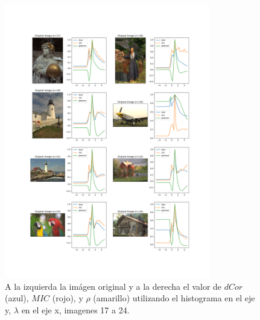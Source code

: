 \begin{figure}
    \centering
    \includegraphics[width=0.8\textwidth]{figuras/hist_comp_3.png}
    \caption{A la izquierda la im\'agen original y a la derecha el valor de $dCor$ (azul), $MIC$ (rojo), y $\rho$ (amarillo) utilizando el histograma en el eje y, $\lambda$ en el eje x, imagenes 17 a 24.}
\end{figure}




